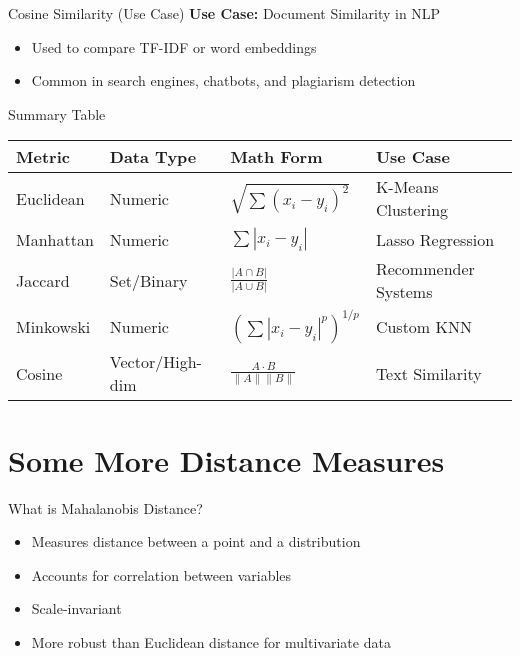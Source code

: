 \documentclass{beamer}
\begin{document}
\begin{frame}{Cosine Similarity (Use Case)}
\textbf{Use Case:} Document Similarity in NLP
\begin{itemize}
    \item Used to compare TF-IDF or word embeddings
    \item Common in search engines, chatbots, and plagiarism detection
\end{itemize}
\end{frame}

\begin{frame}{Summary Table}
\footnotesize
\begin{tabular}{@{}llll@{}}
\toprule
\textbf{Metric} & \textbf{Data Type} & \textbf{Math Form} & \textbf{Use Case} \\
\midrule
Euclidean & Numeric & \( \sqrt{\sum (x_i - y_i)^2} \) & K-Means Clustering \\
Manhattan & Numeric & \( \sum |x_i - y_i| \) & Lasso Regression \\
Jaccard & Set/Binary & \( \frac{|A \cap B|}{|A \cup B|} \) & Recommender Systems \\
Minkowski & Numeric & \( (\sum |x_i - y_i|^p)^{1/p} \) & Custom KNN \\
Cosine & Vector/High-dim & \( \frac{A \cdot B}{\|A\| \|B\|} \) & Text Similarity \\
\bottomrule
\end{tabular}
\end{frame}

\section{Some More Distance Measures}
\begin{frame}{What is Mahalanobis Distance?}
  \begin{itemize}
    \item Measures distance between a point and a distribution
    \item Accounts for correlation between variables
    \item Scale-invariant
    \item More robust than Euclidean distance for multivariate data
  \end{itemize}
\end{frame}
\end{document}
